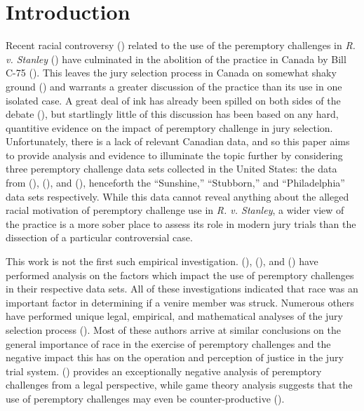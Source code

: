 \section{Introduction} \label{c:introduction}

Recent racial controversy (\cite{fiverejected,fraughthistory})
related to the use of the peremptory challenges in
\textit{R. v. Stanley} (\cite{GeraldStanleyVerdict}) have culminated
in the abolition of the practice in Canada by Bill C-75 (\cite{billc75}). This leaves the jury selection process in Canada on somewhat shaky ground (\cite{trialsrisk}) and warrants a greater discussion of the practice than its use in one isolated case. A great deal of ink has
already been spilled on both sides of the debate (\cite{peremparegood,bothwrong,goodfirststep}), but startlingly
little of this discussion has been based on any hard, quantitive evidence on the impact of peremptory challenge in jury
selection. Unfortunately, there is a lack of relevant Canadian data, and so this paper aims to provide analysis and evidence to illuminate the topic further by considering three peremptory
challenge data sets collected in the United States: the data from (\cite{JurySunshineProj}), (\cite{StubbornLegacy}), and
(\cite{PerempChalMurder}), henceforth the ``Sunshine,'' ``Stubborn,'' and ``Philadelphia'' data sets respectively. While this data cannot reveal anything about the alleged racial motivation of peremptory challenge use in
\textit{R. v. Stanley}, a wider view of the practice is a more sober
place to assess its role in modern jury trials than the dissection of a particular controversial case.

This work is not the first such empirical investigation. (\cite{JurySunshineProj}), (\cite{StubbornLegacy}), and
(\cite{PerempChalMurder}) have performed analysis on the factors which
impact the use of peremptory challenges in their respective data
sets. All of these
investigations indicated that race was an important factor in
determining if a venire member was struck. Numerous others have
performed unique legal, empirical, and mathematical analyses of the jury
selection process
(\cite{hoffman1997,vandykejurysel,hansvidjudging,brown1978,ford2010}). Most of these authors arrive at similar conclusions on the general importance of race in the exercise of peremptory challenges
and the negative impact this has on the operation and perception of justice in the jury trial system. (\cite{hoffman1997}) provides an
exceptionally negative analysis of peremptory challenges from a legal perspective, while game theory analysis suggests that the use of peremptory challenges may even be counter-productive (\cite{ford2010}).

